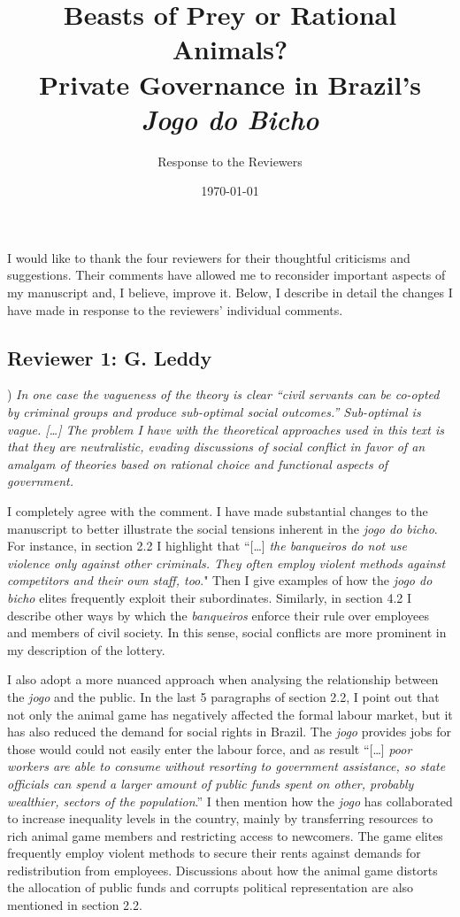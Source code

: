 \documentclass[a4paper,12pt]{article}
\title{Beasts of Prey or Rational Animals? \\Private Governance in Brazil's \textit{Jogo do Bicho}}
\author{Response to the Reviewers}
\date{\today}
\begin{document}
\maketitle

I would like to thank the four reviewers for their thoughtful criticisms and suggestions. Their comments have allowed me to reconsider important aspects of my manuscript and, I believe, improve it. Below, I describe in detail the changes I have made in response to the reviewers' individual comments.

\subsection*{Reviewer 1: G. Leddy} %
\label{sub:reviewer_1_g_leddy}

) \textit{In one case the vagueness of the theory is clear ``civil servants can be co-opted by criminal groups and produce sub-optimal social outcomes.'' Sub-optimal is vague. [\dots] The problem I have with the theoretical approaches used in this text is that they are neutralistic, evading discussions of social conflict in favor of an amalgam of theories based on rational choice and functional aspects of government.}

\vspace{.25cm}

I completely agree with the comment. I have made substantial changes to the manuscript to better illustrate the social tensions inherent in the \textit{jogo do bicho}. For instance, in section 2.2 I highlight that ``[\dots] \textit{the banqueiros do not use violence only against other criminals. They often employ violent methods against competitors and their own staff, too}." Then I give examples of how the \textit{jogo do bicho} elites frequently exploit their subordinates. Similarly, in section 4.2 I describe other ways by which the \textit{banqueiros} enforce their rule over employees and members of civil society. In this sense, social conflicts are more prominent in my description of the lottery. 

I also adopt a more nuanced approach when analysing the relationship between the \textit{jogo} and the public. In the last 5 paragraphs of section 2.2, I point out that not only the animal game has negatively affected the formal labour market, but it has also reduced the demand for social rights in Brazil. The \textit{jogo} provides jobs for those would could not easily enter the labour force, and as result ``[\dots] \textit{poor workers are able to consume without resorting to government assistance, so state officials can spend a larger amount of public funds spent on other, probably wealthier, sectors of the population}.'' I then mention how the \textit{jogo} has collaborated to increase inequality levels in the country, mainly by transferring resources to rich animal game members and restricting access to newcomers. The game elites frequently employ violent methods to secure their rents against demands for redistribution from employees. Discussions about how the animal game distorts the allocation of public funds and corrupts political representation are also mentioned in section 2.2.
\end{document}
